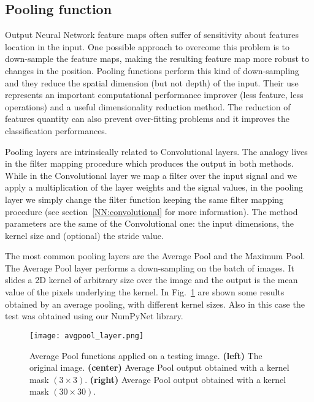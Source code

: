 \documentclass{standalone}
\begin{document}
\subsection[Pooling function]{Pooling function}\label{NN:pooling}

Output Neural Network feature maps often suffer of sensitivity about features location in the input.
One possible approach to overcome this problem is to down-sample the feature maps, making the resulting feature map more robust to changes in the position.
Pooling functions perform this kind of down-sampling and they reduce the spatial dimension (but not depth) of the input.
Their use represents an important computational performance improver (less feature, less operations) and a useful dimensionality reduction method.
The reduction of features quantity can also prevent over-fitting problems and it improves the classification performances.

Pooling layers are intrinsically related to Convolutional layers.
The analogy lives in the filter mapping procedure which produces the output in both methods.
While in the Convolutional layer we map a filter over the input signal and we apply a multiplication of the layer weights and the signal values, in the pooling layer we simply change the filter function keeping the same filter mapping procedure (see section~\ref{NN:convolutional} for more information).
The method parameters are the same of the Convolutional one: the input dimensions, the kernel size and (optional) the stride value.

The most common pooling layers are the Average Pool and the Maximum Pool.
The Average Pool layer performs a down-sampling on the batch of images.
It slides a 2D kernel of arbitrary size over the image and the output is the mean value of the pixels underlying the kernel.
In Fig.~\ref{fig:avgpool} are shown some results obtained by an average pooling, with different kernel sizes.
Also in this case the test was obtained using our \textsf{NumPyNet} library.

\begin{center}
\begin{figure}[htbp]
\centering
\texttt{[image: avgpool\_layer.png]}
\caption{Average Pool functions applied on a testing image.
\textbf{(left)} The original image.
\textbf{(center)} Average Pool output obtained with a kernel mask $(3\times 3)$.
\textbf{(right)} Average Pool output obtained with a kernel mask $(30\times 30)$.
}
\label{fig:avgpool}
\end{figure}
\end{center}
\end{document}
